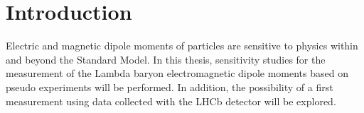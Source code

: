 \chapter*{Introduction}

Electric and magnetic dipole moments of particles are sensitive to physics within and beyond the Standard Model. In this thesis, sensitivity studies for the measurement of the Lambda baryon electromagnetic dipole moments based on pseudo experiments will be performed. In addition, the possibility of a first measurement using data collected with the LHCb detector will be explored. 
